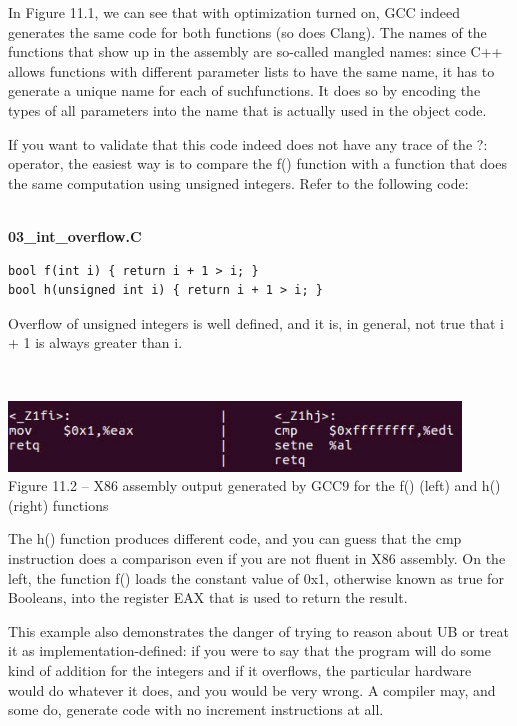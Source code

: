 In Figure 11.1, we can see that with optimization turned on, GCC indeed generates the same code for both functions (so does Clang). The names of the functions that show up in the assembly are so-called mangled names: since C++ allows functions with different parameter lists to have the same name, it has to generate a unique name for each of suchfunctions. It does so by encoding the types of all parameters into the name that is actually used in the object code.

If you want to validate that this code indeed does not have any trace of the ?: operator, the easiest way is to compare the f() function with a function that does the same computation using unsigned integers. Refer to the following code:

\hspace*{\fill} \\ %
\noindent
\textbf{03\_int\_overflow.C}
\begin{lstlisting}[style=styleCXX]
bool f(int i) { return i + 1 > i; }
bool h(unsigned int i) { return i + 1 > i; }
\end{lstlisting}

Overflow of unsigned integers is well defined, and it is, in general, not true that i + 1 is always greater than i. 

\hspace*{\fill} \\ %
\begin{center}
\includegraphics[width=0.9\textwidth]{content/3/chapter11/images/2.jpg}\\
Figure 11.2 – X86 assembly output generated by GCC9 for the f() (left) and h() (right) functions
\end{center}

The h() function produces different code, and you can guess that the cmp instruction does a comparison even if you are not fluent in X86 assembly. On the left, the function f() loads the constant value of 0x1, otherwise known as true for Booleans, into the register EAX that is used to return the result. 

This example also demonstrates the danger of trying to reason about UB or treat it as implementation-defined: if you were to say that the program will do some kind of addition for the integers and if it overflows, the particular hardware would do whatever it does, and you would be very wrong. A compiler may, and some do, generate code with no increment instructions at all.

